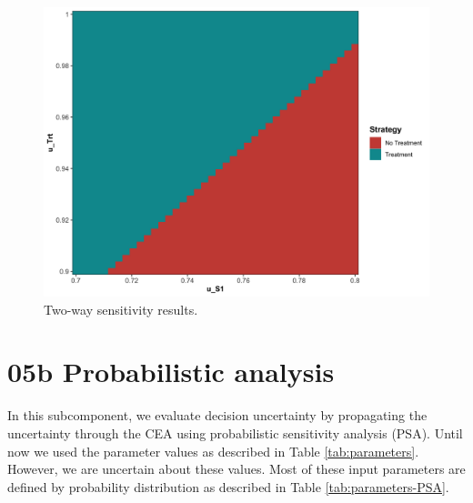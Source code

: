 \documentclass[]{book}
\begin{document}
\begin{figure}

{\centering \includegraphics[width=1\linewidth]{../figs/05a_twsa_uS1_uTrt_nmb} 

}

\caption{Two-way sensitivity results.}\label{fig:05a-twsa-uS1-uTrt-nmb}
\end{figure}

\hypertarget{Probabilistic-analysis}{%
\section{05b Probabilistic analysis}\label{Probabilistic-analysis}}

In this subcomponent, we evaluate decision uncertainty by propagating the uncertainty through the CEA using probabilistic sensitivity analysis (PSA). Until now we used the parameter values as described in Table \ref{tab:parameters}. However, we are uncertain about these values. Most of these input parameters are defined by probability distribution as described in Table \ref{tab:parameters-PSA}.
\end{document}
